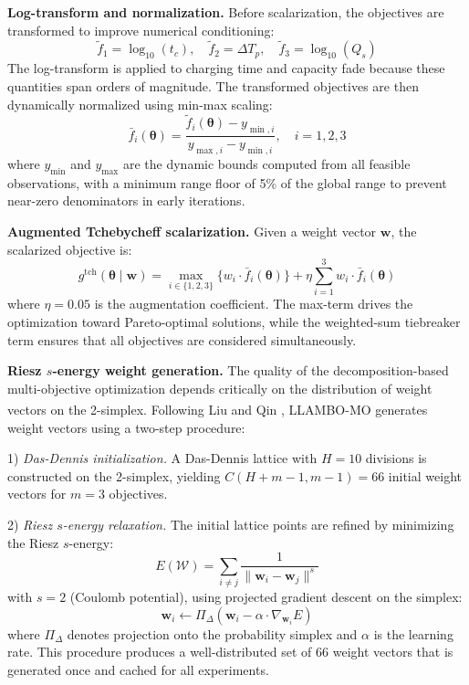 \documentclass[lettersize,journal]{IEEEtran}
\let\OLDcite\cite
\renewcommand{\cite}[1]{\textsuperscript{\OLDcite{#1}}}
\begin{document}
\textbf{Log-transform and normalization.} Before scalarization, the objectives are transformed to improve numerical conditioning:
\begin{equation}
\label{eq:log_transform}
\tilde{f}_1 = \log_{10}(t_c), \quad \tilde{f}_2 = \Delta T_p, \quad \tilde{f}_3 = \log_{10}(Q_s)
\end{equation}
The log-transform is applied to charging time and capacity fade because these quantities span orders of magnitude. The transformed objectives are then dynamically normalized using min-max scaling:
\begin{equation}
\label{eq:normalize}
\bar{f}_i(\boldsymbol{\theta}) = \frac{\tilde{f}_i(\boldsymbol{\theta}) - y_{\min,i}}{y_{\max,i} - y_{\min,i}}, \quad i = 1, 2, 3
\end{equation}
where $y_{\min}$ and $y_{\max}$ are the dynamic bounds computed from all feasible observations, with a minimum range floor of 5\% of the global range to prevent near-zero denominators in early iterations.

\textbf{Augmented Tchebycheff scalarization.} Given a weight vector $\boldsymbol{w}$, the scalarized objective is:
\begin{equation}
\label{eq:tchebycheff}
g^{\text{tch}}(\boldsymbol{\theta} \mid \boldsymbol{w}) = \max_{i \in \{1,2,3\}} \{w_i \cdot \bar{f}_i(\boldsymbol{\theta})\} + \eta \sum_{i=1}^{3} w_i \cdot \bar{f}_i(\boldsymbol{\theta})
\end{equation}
where $\eta = 0.05$ is the augmentation coefficient. The max-term drives the optimization toward Pareto-optimal solutions, while the weighted-sum tiebreaker term ensures that all objectives are considered simultaneously.

\textbf{Riesz $s$-energy weight generation.} The quality of the decomposition-based multi-objective optimization depends critically on the distribution of weight vectors on the 2-simplex. Following Liu and Qin \cite{ref_riesz}, LLAMBO-MO generates weight vectors using a two-step procedure:

1) \textit{Das-Dennis initialization.} A Das-Dennis lattice with $H = 10$ divisions is constructed on the 2-simplex, yielding $C(H+m-1, m-1) = 66$ initial weight vectors for $m = 3$ objectives.

2) \textit{Riesz $s$-energy relaxation.} The initial lattice points are refined by minimizing the Riesz $s$-energy:
\begin{equation}
\label{eq:riesz}
E(\mathcal{W}) = \sum_{i \neq j} \frac{1}{\|\boldsymbol{w}_i - \boldsymbol{w}_j\|^s}
\end{equation}
with $s = 2$ (Coulomb potential), using projected gradient descent on the simplex:
\begin{equation}
\label{eq:riesz_gd}
\boldsymbol{w}_i \leftarrow \Pi_{\Delta} \left( \boldsymbol{w}_i - \alpha \cdot \nabla_{\boldsymbol{w}_i} E \right)
\end{equation}
where $\Pi_{\Delta}$ denotes projection onto the probability simplex and $\alpha$ is the learning rate. This procedure produces a well-distributed set of 66 weight vectors that is generated once and cached for all experiments.
\end{document}
